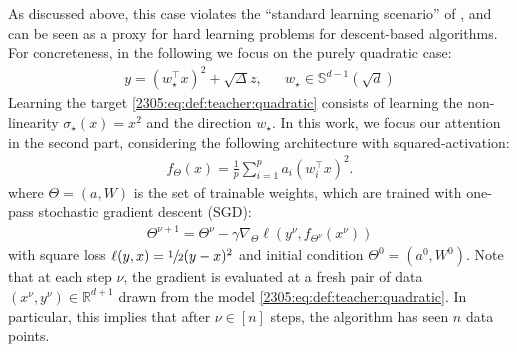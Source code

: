 As discussed above, this case violates the ``standard learning scenario'' of \cite{berthier2023learning}, and can be seen as a proxy for hard learning problems for descent-based algorithms. For concreteness, in the following we focus on the purely quadratic case:
\begin{align}
\label{2305:eq:def:teacher:quadratic}
 y = \left(w_{\star}^{\top}x\right)^2  + \sqrt{\Delta}z, && w_{\star}\in\mathbb{S}^{d-1}(\sqrt{d})
\end{align}
Learning the target \eqref{2305:eq:def:teacher:quadratic} consists of learning the non-linearity $\sigma_{\star}(x)=x^2$ and the direction $w_{\star}$. In this work, we focus our attention in the second part, considering the following architecture with squared-activation: 
\begin{align}
\label{2305:eq:student}
    f_{\Theta}(x) = \frac{1}{p}\sum\limits_{i=1}^{p}a_{i}(w_{i}^{\top}x)^2.
\end{align}
where $\Theta = (a,W)$ is the set of trainable weights, which are trained with one-pass stochastic gradient descent (SGD):
\begin{align}
\label{2305:eq:sgd}
    \Theta^{\nu+1} = \Theta^{\nu} -\gamma \nabla_{\Theta}\ell(y^{\nu},f_{\Theta^{\nu}}(x^{\nu}))
\end{align}
with square loss $\ell(y,x)=\sfrac{1}{2}(y-x)^2$ and initial condition $\Theta^{0} = (a^{0}, W^{0})$. Note that at each step $\nu$, the gradient is evaluated at a fresh pair of data $(x^{\nu}, y^{\nu})\in\mathbb{R}^{d+1}$ drawn from the model \eqref{2305:eq:def:teacher:quadratic}.
In particular, this implies that after $\nu\in[n]$ steps, the algorithm has seen $n$ data points. 

